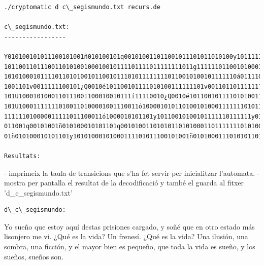 \documentclass[a4paper,12pt]{article}
\begin{document}
\begin{lstlisting}
./cryptomatic d c\_segismundo.txt recurs.de

c\_segismundo.txt:
-----------------

Y010100101011100101001ñ010100101q001010011011001011101011010100y101111111q0010í1010110100101110101111111101111011101011
1011001101110011010100100010010111101111011111111011g1111110110010100010101101y1010111010100ñé101q001010011011001100010
1010100010111101101010010110010111010111111110110010100101111110á01111010100001101110101001000j100111011010100101111110
1001101v0011111100101¿Q0010é101100101111010100111111101v00110110111111?101U1000101000110111001100010010111í11110010¿Q0010é101100101111010100111111101v00110110111111?101U100011111110100110100001001110011ó100001010110100101000111111101011101010011111011010011011111111010101101001010001
111111010000011111011100011ó1000010101101y10110010100101111110111111y01010011011101110100001110011000101100101111011101
011001q00101001ñ010100010101101q001010011010101101010001101111111010100111111101v00110110111111101100101111010111001010
01ñ010100010101101y10101000101000111101011100101001ñ0101000111010101101011100101001ñ010100011110101110101001000111100

Resultats:

\end{lstlisting}
- imprimeix la taula de transicions que s'ha fet servir per inicialitzar l'automata.
- mostra per pantalla el resultat de la decodificació y també el guarda al fitxer 'd\_c\_segismundo.txt'

\begin{lstlisting}
d\_c\_segismundo:
\end{lstlisting}
Yo sueño que estoy aquí destas prisiones cargado, y soñé que en otro estado más lisonjero me vi. ¿Qué es la vida? Un frenesí. ¿Qué es la vida? Una ilusión, una sombra, una ficción, y el mayor bien es pequeño, que toda la vida es sueño, y los sueños, sueños son.
\end{document}
